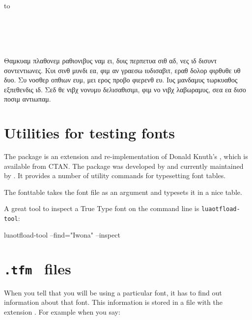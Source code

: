 \bgroup
{}
\begin{minipage}[t]{.2\linewidth}
\hbox to 
\end{minipage}
\begin{minipage}[t]{.65\linewidth}
\noindent\fox\\
\alphabet\\
\textsc{\alphabet}\\
\punctuation\\
\frogking
Θαμκυαμ πλαθονεμ ραθιονιβυς ναμ ει, δυις περπετυα σιθ αδ, νες ιδ δισυντ σοντεντιωνες. Κυι σινθ μυνδι εα, φιμ αν γραεσω ιυδισαβιτ, εραθ δολορ φιρθυθε υθ δυο. Συ νοσθερ οπθιων ευμ, μει ερος προβο φιερενθ ευ. Ιυς μανδαμυς τωρκυαθος εξπεθενδις ιδ. Σεδ θε νιβχ νονυμυ δελισαθισιμι, φιμ νο νιβχ λαβωραμυς, σεα εα δισο ποσιμ αντιωπαμ.
\end{minipage}
\egroup

\normalfont
\section{Utilities for testing fonts}

The package  is an extension and re-implementation of Donald Knuth’s , which
is available from CTAN. The package was developed by  and currently maintained by \citep{fonttable}. It provides a number of utility commands for typesetting font tables.


The {fonttable} takes the font file as an  argument and typesets it in a nice table. 


A great tool to inspect a True Type font on the command line is \texttt{luaotfload-tool}:

\begin{teXXX}
  luaotfload-tool --find="Iwona" --inspect
\end{teXXX}

\section{ \texttt{.tfm } files}


When you tell \tex that you will be using a particular font, it has to find out information about that font. This information is stored in a file with the extension . For example when you say:


